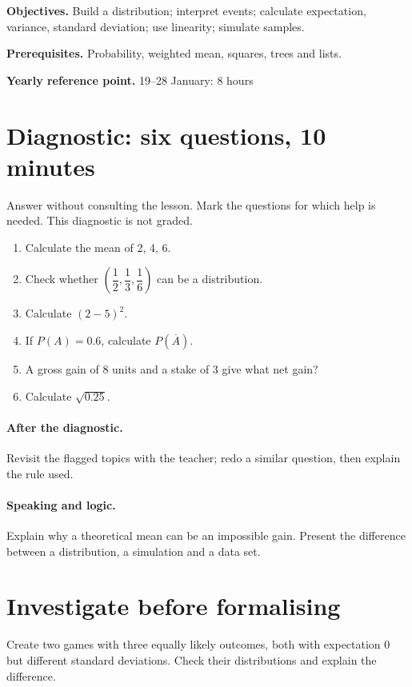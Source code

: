 \label{C08}
\begin{keypoint}
\textbf{Objectives.} Build a distribution; interpret events; calculate expectation, variance, standard deviation; use linearity; simulate samples.

\textbf{Prerequisites.} Probability, weighted mean, squares, trees and lists.

\textbf{Yearly reference point.} 19--28 January: 8 hours\end{keypoint}
\section*{Diagnostic: six questions, 10 minutes}\label{C08-D}
Answer without consulting the lesson. Mark the questions for which help is needed. This diagnostic is not graded.
\begin{enumerate}
\item Calculate the mean of 2, 4, 6.
\item Check whether $(\dfrac{1}{2},\dfrac{1}{3},\dfrac{1}{6})$ can be a distribution.
\item Calculate $(2-5)^2$.
\item If $P(A)=0.6$, calculate $P(\overline A)$.
\item A gross gain of 8 units and a stake of 3 give what net gain?
\item Calculate $\sqrt{0.25}$.
\end{enumerate}
\paragraph{After the diagnostic.} Revisit the flagged topics with the teacher; redo a similar question, then explain the rule used.
\paragraph{Speaking and logic.} Explain why a theoretical mean can be an impossible gain. Present the difference between a distribution, a simulation and a data set.
\mxnewpage
\section*{Investigate before formalising}\label{C08-RECH}
Create two games with three equally likely outcomes, both with expectation 0 but different standard deviations. Check their distributions and explain the difference.
